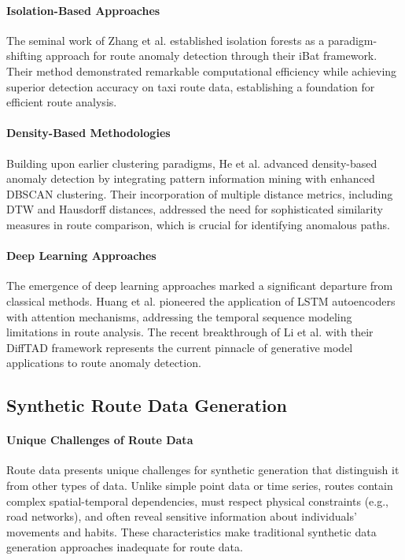 \documentclass[runningheads]{llncs}
\begin{document}
\paragraph{Isolation-Based Approaches}
The seminal work of Zhang et al. \cite{zhang2011ibat} established isolation forests as a paradigm-shifting approach for route anomaly detection through their iBat framework. Their method demonstrated remarkable computational efficiency while achieving superior detection accuracy on taxi route data, establishing a foundation for efficient route analysis.

\paragraph{Density-Based Methodologies}
Building upon earlier clustering paradigms, He et al. \cite{he2019based} advanced density-based anomaly detection by integrating pattern information mining with enhanced DBSCAN clustering. Their incorporation of multiple distance metrics, including DTW and Hausdorff distances, addressed the need for sophisticated similarity measures in route comparison, which is crucial for identifying anomalous paths.

\paragraph{Deep Learning Approaches}
The emergence of deep learning approaches marked a significant departure from classical methods. Huang et al. \cite{huang2021vehicle} pioneered the application of LSTM autoencoders with attention mechanisms, addressing the temporal sequence modeling limitations in route analysis. The recent breakthrough of Li et al. \cite{LI2024111387} with their DiffTAD framework represents the current pinnacle of generative model applications to route anomaly detection.

\subsection{Synthetic Route Data Generation}
\label{sec:generation-review}

\paragraph{Unique Challenges of Route Data}
Route data presents unique challenges for synthetic generation that distinguish it from other types of data. Unlike simple point data or time series, routes contain complex spatial-temporal dependencies, must respect physical constraints (e.g., road networks), and often reveal sensitive information about individuals' movements and habits. These characteristics make traditional synthetic data generation approaches inadequate for route data.
\end{document}
